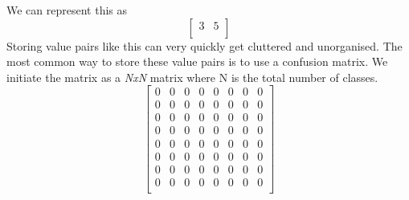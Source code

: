 We can represent this as 
\[
\begin{bmatrix}
 3 & 5\\ 
\end{bmatrix}
\]
Storing value pairs like this can very quickly get cluttered and unorganised.
The most common way to store these value pairs is to use a confusion matrix.  We initiate the matrix as a \textit{NxN} matrix where N is the total number of classes.
\[
\begin{bmatrix}
 0 & 0 &  0 &  0 &  0 &  0 &  0 &  0\\
 0 & 0 &  0 &  0 &  0 &  0 &  0 &  0\\
 0 & 0 &  0 &  0 &  0 &  0 &  0 &  0\\
 0 & 0 &  0 &  0 &  0 &  0 &  0 &  0\\
 0 & 0 &  0 &  0 &  0 &  0 &  0 &  0\\
 0 & 0 &  0 &  0 &  0 &  0 &  0 &  0\\
 0 & 0 &  0 &  0 &  0 &  0 &  0 &  0\\
 0 & 0 &  0 &  0 &  0 &  0 &  0 &  0\\
\end{bmatrix}
\]

